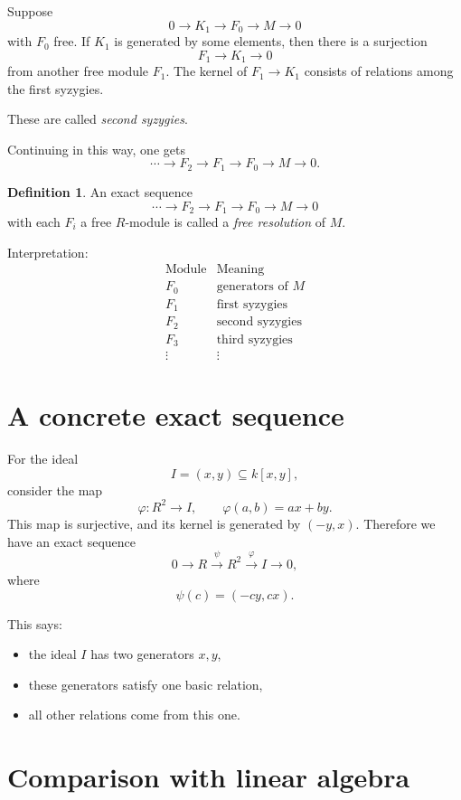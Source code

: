 \documentclass[11pt]{article}
\theoremstyle{definition}
\newtheorem{definition}[theorem]{Definition}
\theoremstyle{remark}
\begin{document}
	Suppose
	\[
	0\to K_1\to F_0\to M\to 0
	\]
	with \(F_0\) free. If \(K_1\) is generated by some elements, then there is a surjection
	\[
	F_1\to K_1\to 0
	\]
	from another free module \(F_1\). The kernel of \(F_1\to K_1\) consists of relations among the first syzygies.
	
	These are called \emph{second syzygies}.
	
	Continuing in this way, one gets
	\[
	\cdots \to F_2\to F_1\to F_0\to M\to 0.
	\]
	
	\begin{definition}
		An exact sequence
		\[
		\cdots \to F_2\to F_1\to F_0\to M\to 0
		\]
		with each \(F_i\) a free \(R\)-module is called a \emph{free resolution} of \(M\).
	\end{definition}
	
	Interpretation:
	\[
	\begin{array}{c|c}
		\text{Module} & \text{Meaning} \\
		\hline
		F_0 & \text{generators of }M \\
		F_1 & \text{first syzygies} \\
		F_2 & \text{second syzygies} \\
		F_3 & \text{third syzygies} \\
		\vdots & \vdots
	\end{array}
	\]
	
	\section{A concrete exact sequence}
	
	For the ideal
	\[
	I=(x,y)\subseteq k[x,y],
	\]
	consider the map
	\[
	\varphi:R^2\to I,
	\qquad
	\varphi(a,b)=ax+by.
	\]
	This map is surjective, and its kernel is generated by \((-y,x)\). Therefore we have an exact sequence
	\[
	0\to R \xrightarrow{\psi} R^2 \xrightarrow{\varphi} I\to 0,
	\]
	where
	\[
	\psi(c)=(-cy,cx).
	\]
	
	This says:
	
	\begin{itemize}[leftmargin=2em]
		\item the ideal \(I\) has two generators \(x,y\),
		\item these generators satisfy one basic relation,
		\item all other relations come from this one.
	\end{itemize}
	
	\section{Comparison with linear algebra}
	
\end{document}
